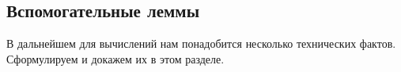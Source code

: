 \documentclass[../../paper.tex]{subfiles}
\begin{document}
\subsection{Вспомогательные леммы}
В дальнейшем для вычислений нам понадобится несколько технических фактов. Сформулируем и докажем их в этом разделе.

%

%

%

%

%

%

%

\end{document}
